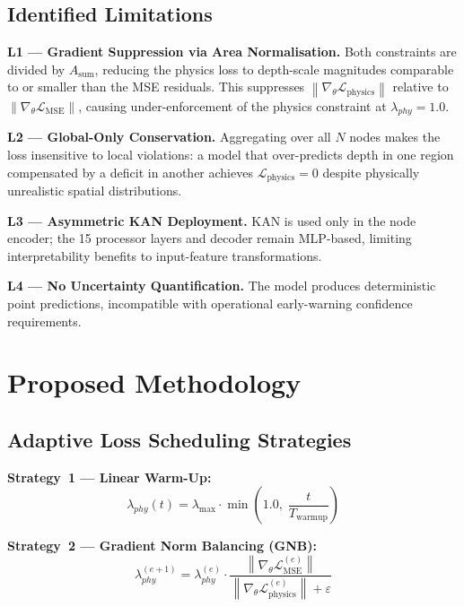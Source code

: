 \documentclass[conference]{IEEEtran}
\newcommand{\norm}[1]{\left\lVert#1\right\rVert}
\begin{document}
\subsection{Identified Limitations}

\textbf{L1 — Gradient Suppression via Area Normalisation.}
Both constraints are divided by $A_{\text{sum}}$, reducing the physics loss
to depth-scale magnitudes comparable to or smaller than the MSE residuals.
This suppresses $\norm{\nabla_\theta\mathcal{L}_{\text{physics}}}$ relative
to $\norm{\nabla_\theta\mathcal{L}_{\text{MSE}}}$, causing
under-enforcement of the physics constraint at $\lambda_{phy}=1.0$.

\textbf{L2 — Global-Only Conservation.}
Aggregating over all $N$ nodes makes the loss insensitive to local
violations: a model that over-predicts depth in one region compensated by
a deficit in another achieves $\mathcal{L}_{\text{physics}}=0$ despite
physically unrealistic spatial distributions.

\textbf{L3 — Asymmetric KAN Deployment.}
KAN is used only in the node encoder; the 15 processor layers and decoder
remain MLP-based, limiting interpretability benefits to input-feature
transformations.

\textbf{L4 — No Uncertainty Quantification.}
The model produces deterministic point predictions, incompatible with
operational early-warning confidence requirements.

\section{Proposed Methodology}
\label{sec:method}

\subsection{Adaptive Loss Scheduling Strategies}

\textbf{Strategy~1 — Linear Warm-Up:}
\begin{equation}
  \lambda_{phy}(t) = \lambda_{\max}\cdot
    \min\!\left(1.0,\;\frac{t}{T_{\text{warmup}}}\right)
\end{equation}

\textbf{Strategy~2 — Gradient Norm Balancing (GNB):}
\begin{equation}
  \lambda_{phy}^{(e+1)} = \lambda_{phy}^{(e)}\cdot
    \frac{\norm{\nabla_\theta\mathcal{L}_{\text{MSE}}^{(e)}}}
         {\norm{\nabla_\theta\mathcal{L}_{\text{physics}}^{(e)}}+\varepsilon}
  \label{eq:gnb}
\end{equation}
\end{document}
